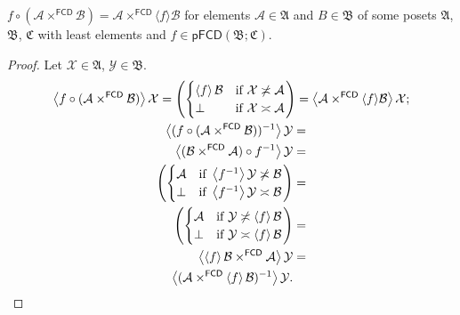 \begin{prop}
$f\circ(\mathcal{A}\times^{\mathsf{FCD}}\mathcal{B})=\mathcal{A}\times^{\mathsf{FCD}}\langle f\rangle\mathcal{B}$
for elements $\mathcal{A}\in\mathfrak{A}$ and $B\in\mathfrak{B}$
of some posets $\mathfrak{A}$, $\mathfrak{B}$, $\mathfrak{C}$ with
least elements and $f\in\mathsf{pFCD}(\mathfrak{B};\mathfrak{C})$.\end{prop}
\begin{proof}
Let $\mathcal{X}\in\mathfrak{A}$, $\mathcal{Y}\in\mathfrak{B}$.
\begin{gather*}
\left\langle f\circ(\mathcal{A}\times^{\mathsf{FCD}}\mathcal{B})\right\rangle\mathcal{X}=\left(\begin{cases}
\left\langle f\right\rangle\mathcal{B} & \text{if }\mathcal{X}\not\asymp\mathcal{A}\\
\bot & \text{if }\mathcal{X}\asymp\mathcal{A}
\end{cases}\right)=\left\langle \mathcal{A}\times^{\mathsf{FCD}}\langle f\rangle\mathcal{B}\right\rangle\mathcal{X};\\
\begin{aligned}\left\langle (f\circ(\mathcal{A}\times^{\mathsf{FCD}}\mathcal{B}))^{-1}\right\rangle\mathcal{Y} & =\\
\left\langle (\mathcal{B}\times^{\mathsf{FCD}}\mathcal{A})\circ f^{-1}\right\rangle\mathcal{Y} & =\\
\left(\begin{cases}
\mathcal{A} & \text{if }\left\langle f^{-1}\right\rangle\mathcal{Y}\not\asymp\mathcal{B}\\
\bot & \text{if }\left\langle f^{-1}\right\rangle\mathcal{Y}\asymp\mathcal{B}
\end{cases}\right) & =\\
\left(\begin{cases}
\mathcal{A} & \text{if }\mathcal{Y}\not\asymp\left\langle f\right\rangle\mathcal{B}\\
\bot & \text{if }\mathcal{Y}\asymp\left\langle f\right\rangle\mathcal{B}
\end{cases}\right) & =\\
\left\langle \left\langle f\right\rangle\mathcal{B}\times^{\mathsf{FCD}}\mathcal{A}\right\rangle\mathcal{Y} & =\\
\left\langle (\mathcal{A}\times^{\mathsf{FCD}}\left\langle f\right\rangle\mathcal{B})^{-1}\right\rangle\mathcal{Y}.
\end{aligned}
\end{gather*}

\end{proof}

